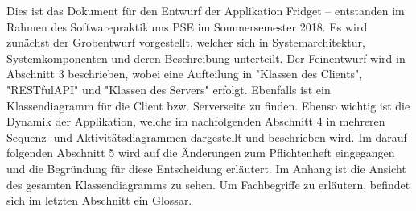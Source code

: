 Dies ist das Dokument für den Entwurf der Applikation Fridget – entstanden im Rahmen des Softwarepraktikums PSE im Sommersemester 2018.
Es wird zunächst der Grobentwurf vorgestellt, welcher sich in Systemarchitektur, Systemkomponenten und deren Beschreibung unterteilt. 
Der Feinentwurf wird in Abschnitt 3 beschrieben, wobei eine Aufteilung in "Klassen des Clients", "RESTfulAPI" und "Klassen des Servers" erfolgt. Ebenfalls ist ein Klassendiagramm für die Client bzw. Serverseite zu finden. 
Ebenso wichtig ist die Dynamik der Applikation, welche im nachfolgenden Abschnitt 4 in mehreren Sequenz- und Aktivitätsdiagrammen dargestellt und beschrieben wird.  
Im darauf folgenden Abschnitt 5 wird auf die Änderungen zum Pflichtenheft eingegangen und die Begründung für diese Entscheidung erläutert.
Im Anhang ist die Ansicht des gesamten Klassendiagramms zu sehen.
Um Fachbegriffe zu erläutern, befindet sich im letzten Abschnitt ein Glossar.
